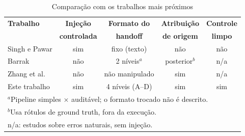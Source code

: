 \begin{table}[htbp]
\caption{Comparação com os trabalhos mais próximos}
\label{tab:relacionados}
\centering
\footnotesize
\setlength{\tabcolsep}{3pt}
\begin{tabular}{|l|c|c|c|c|}
\hline
\textbf{Trabalho} & \textbf{Injeção} & \textbf{Formato do} & \textbf{Atribuição} & \textbf{Controle} \\
 & \textbf{controlada} & \textbf{handoff} & \textbf{de origem} & \textbf{limpo} \\
\hline
Singh e Pawar \cite{singh2026snowball} & sim & fixo (texto) & não & não \\
Barrak \cite{barrak2025traceability} & não & 2 níveis$^{a}$ & posterior$^{b}$ & n/a \\
Zhang et al. \cite{zhang2025which} & não & não manipulado & sim & n/a \\
Este trabalho & sim & 4 níveis (A--D) & sim & sim \\
\hline
\multicolumn{5}{l}{\scriptsize $^{a}$Pipeline simples $\times$ auditável; o formato trocado não é descrito.} \\
\multicolumn{5}{l}{\scriptsize $^{b}$Usa rótulos de ground truth, fora da execução.} \\
\multicolumn{5}{l}{\scriptsize n/a: estudos sobre erros naturais, sem injeção.} \\
\end{tabular}
\end{table}
